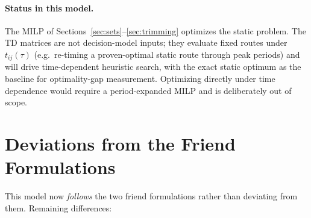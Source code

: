 \documentclass[10pt]{article}
\begin{document}
\paragraph{Status in this model.} The MILP of
Sections~\ref{sec:sets}--\ref{sec:trimming} optimizes the static problem. The TD
matrices are not decision-model inputs; they evaluate fixed routes under
$t_{ij}(\tau)$ (e.g.\ re-timing a proven-optimal static route through peak
periods) and will drive time-dependent heuristic search, with the exact static
optimum as the baseline for optimality-gap measurement. Optimizing directly
under time dependence would require a period-expanded MILP and is deliberately
out of scope.

\section{Deviations from the Friend Formulations}
\label{sec:deviations}

This model now \emph{follows} the two friend formulations rather than
deviating from them. Remaining differences:
\end{document}
